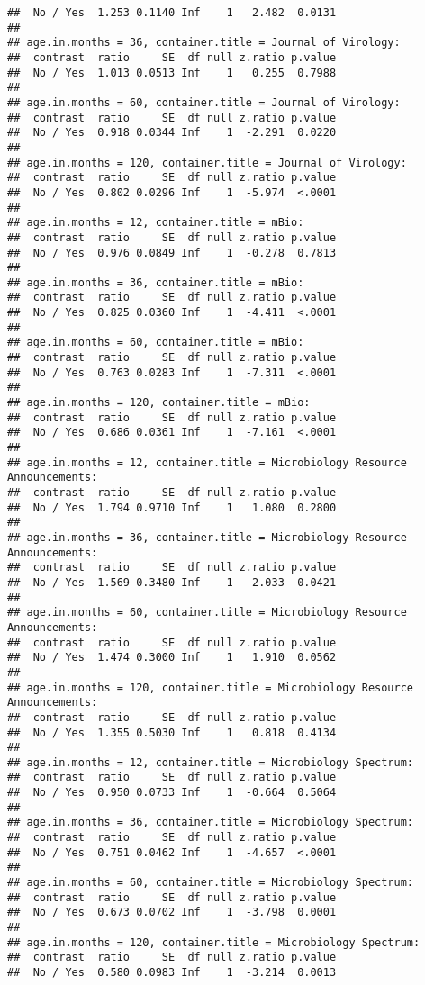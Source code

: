 \documentclass[
]{article}
\begin{document}
\begin{verbatim}
##  No / Yes  1.253 0.1140 Inf    1   2.482  0.0131
## 
## age.in.months = 36, container.title = Journal of Virology:
##  contrast  ratio     SE  df null z.ratio p.value
##  No / Yes  1.013 0.0513 Inf    1   0.255  0.7988
## 
## age.in.months = 60, container.title = Journal of Virology:
##  contrast  ratio     SE  df null z.ratio p.value
##  No / Yes  0.918 0.0344 Inf    1  -2.291  0.0220
## 
## age.in.months = 120, container.title = Journal of Virology:
##  contrast  ratio     SE  df null z.ratio p.value
##  No / Yes  0.802 0.0296 Inf    1  -5.974  <.0001
## 
## age.in.months = 12, container.title = mBio:
##  contrast  ratio     SE  df null z.ratio p.value
##  No / Yes  0.976 0.0849 Inf    1  -0.278  0.7813
## 
## age.in.months = 36, container.title = mBio:
##  contrast  ratio     SE  df null z.ratio p.value
##  No / Yes  0.825 0.0360 Inf    1  -4.411  <.0001
## 
## age.in.months = 60, container.title = mBio:
##  contrast  ratio     SE  df null z.ratio p.value
##  No / Yes  0.763 0.0283 Inf    1  -7.311  <.0001
## 
## age.in.months = 120, container.title = mBio:
##  contrast  ratio     SE  df null z.ratio p.value
##  No / Yes  0.686 0.0361 Inf    1  -7.161  <.0001
## 
## age.in.months = 12, container.title = Microbiology Resource Announcements:
##  contrast  ratio     SE  df null z.ratio p.value
##  No / Yes  1.794 0.9710 Inf    1   1.080  0.2800
## 
## age.in.months = 36, container.title = Microbiology Resource Announcements:
##  contrast  ratio     SE  df null z.ratio p.value
##  No / Yes  1.569 0.3480 Inf    1   2.033  0.0421
## 
## age.in.months = 60, container.title = Microbiology Resource Announcements:
##  contrast  ratio     SE  df null z.ratio p.value
##  No / Yes  1.474 0.3000 Inf    1   1.910  0.0562
## 
## age.in.months = 120, container.title = Microbiology Resource Announcements:
##  contrast  ratio     SE  df null z.ratio p.value
##  No / Yes  1.355 0.5030 Inf    1   0.818  0.4134
## 
## age.in.months = 12, container.title = Microbiology Spectrum:
##  contrast  ratio     SE  df null z.ratio p.value
##  No / Yes  0.950 0.0733 Inf    1  -0.664  0.5064
## 
## age.in.months = 36, container.title = Microbiology Spectrum:
##  contrast  ratio     SE  df null z.ratio p.value
##  No / Yes  0.751 0.0462 Inf    1  -4.657  <.0001
## 
## age.in.months = 60, container.title = Microbiology Spectrum:
##  contrast  ratio     SE  df null z.ratio p.value
##  No / Yes  0.673 0.0702 Inf    1  -3.798  0.0001
## 
## age.in.months = 120, container.title = Microbiology Spectrum:
##  contrast  ratio     SE  df null z.ratio p.value
##  No / Yes  0.580 0.0983 Inf    1  -3.214  0.0013

\end{verbatim}
\end{document}
